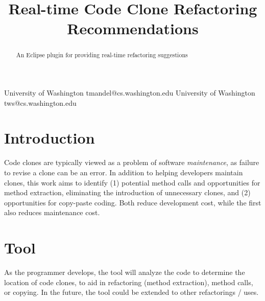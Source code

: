 \documentclass[preprint,10pt]{sigplanconf}
\begin{document}
%

\title{Real-time Code Clone Refactoring Recommendations}
           {University of Washington}
           {tmandel@cs.washington.edu}
           {University of Washington}
           {tws@cs.washington.edu}
\maketitle
\begin{abstract}
An Eclipse plugin for providing real-time refactoring suggestions
\end{abstract}



\section{Introduction}

Code clones are typically viewed as a problem of software
\emph{maintenance}, as failure to revise a clone can be an error. In
addition to helping developers maintain clones, this work aims to
identify (1) potential method calls and opportunities for method
extraction, eliminating the introduction of unnecessary clones, and
(2) opportunities for copy-paste coding. Both reduce development cost,
while the first also reduces maintenance cost.


\section{Tool}


As the programmer develops, the tool will analyze the code to
determine the location of code clones, to aid in refactoring (method
extraction), method calls, or copying. In the future, the tool could
be extended to other refactorings / uses.
\end{document}
